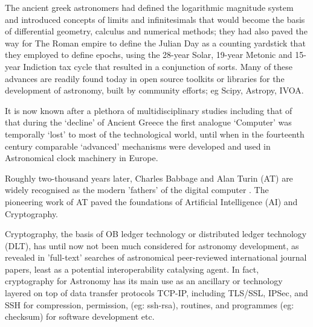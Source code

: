 \documentclass[final,5p,times,twocolumn,authoryear]{elsarticle}
\begin{document}
 The ancient greek astronomers had defined the logarithmic magnitude system and introduced concepts of limits and infinitesimals that would become the basis of differential geometry, calculus and numerical methods; they had also paved the way for The Roman empire to define the Julian Day as a counting yardstick that they employed to define epochs, using the 28-year Solar, 19-year Metonic and 15-year Indiction tax cycle that resulted in a conjunction of sorts. Many of these advances are readily found today in open source toolkits or libraries for the development of astronomy, built by community efforts; eg Scipy, Astropy, IVOA. 
 
 It is now known after a plethora of multidisciplinary studies including that of \cite{Freeth2021} that during the `decline' of Ancient Greece the first analogue `Computer' was temporally `lost' to most of the technological world, until when in the fourteenth century comparable `advanced' mechanisms were developed and used in Astronomical clock machinery in Europe. 
 
 Roughly two-thousand years later, Charles Babbage and Alan Turin (AT) are widely recognised as the modern 'fathers' of the digital computer \citep{swa2017}. The pioneering work of AT paved the foundations of Artificial Intelligence (AI) and Cryptography. 
 
Cryptography, the basis of OB ledger technology or distributed ledger technology (DLT), has until now not been much considered for astronomy development, as revealed in 'full-text' searches of astronomical peer-reviewed international journal papers, least as a potential interoperability catalysing agent. In fact, cryptography for Astronomy has its main use as an ancillary or technology layered on top of data transfer protocols TCP-IP, including TLS/SSL, IPSec, and SSH for compression, permission, (eg: ssh-rsa), routines, and programmes (eg: checksum) for software development etc.
\end{document}
